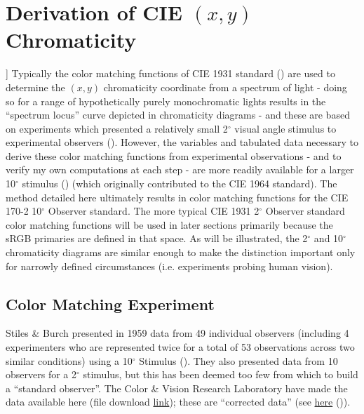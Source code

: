 \documentclass[twocolumn]{article}
\begin{document}
\section{Derivation of CIE $(x,y)$ Chromaticity} \label{sec:derivation}
]
Typically the color matching functions of CIE 1931 standard (\cite{cie1932commission}) are used to determine the $(x,y)$ chromaticity coordinate from a spectrum of light - doing so for a range of hypothetically purely monochromatic lights results in the “spectrum locus” curve depicted in chromaticity diagrams - and these are based on experiments which presented a relatively small 2$^\circ$ visual angle stimulus to experimental observers (\cite{wright1929re,guild1931colorimetric}).  However, the variables and tabulated data necessary to derive these color matching functions from experimental observations - and to verify my own computations at each step - are more readily available for a larger 10$^\circ$ stimulus (\cite{stiles1959npl}) (which originally contributed to the CIE 1964 standard).  The method detailed here ultimately results in color matching functions for the CIE 170-2 10$^\circ$ Observer standard.  The more typical CIE 1931 2$^\circ$ Observer standard color matching functions will be used in later sections primarily because the sRGB primaries are defined in that space.  As will be illustrated, the 2$^\circ$ and 10$^\circ$ chromaticity diagrams are similar enough to make the distinction important only for narrowly defined circumstances (i.e. experiments probing human vision).\\

\subsection{Color Matching Experiment} \label{sec:experiment}
Stiles \& Burch presented in 1959 data from 49 individual observers (including 4 experimenters who are represented twice for a total of 53 observations across two similar conditions) using a 10$^\circ$ Stimulus (\cite{stiles1959npl}).  They also presented data from 10 observers for a 2$^\circ$ stimulus, but this has been deemed too few from which to build a “standard observer”.  The Color \& Vision Research Laboratory have made the data available here (file download \href{http://www.cvrl.org/database/data/sb_individual/SB10_corrected_indiv_CMFs.xls}{link}); these are “corrected data” (see \href{http://www.cvrl.org/database/text/sb_individual/sb10_individual.htm}{here} (\cite{stiles1958average})).
\end{document}
